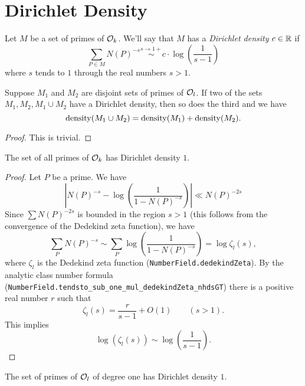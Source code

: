 \section{Dirichlet Density}

\begin{definition} \label{def:Dirichlet density}
	Let $M$ be a set of primes of ${\mathcal O}_k$.
	We'll say that $M$ has a \emph{Dirichlet density} $c \in {\mathbb R}$ if
	\[
		\sum_{P \in M} N(P)^{-s} \stackrel{s \to 1+}\sim c  \cdot \log\left(\frac{1}{s-1}\right)
	\]
	where $s$ tends to $1$ through the real numbers $s>1$.
\end{definition}


\begin{lemma}
	Suppose $M_1$ and $M_2$ are disjoint sets of primes of ${\mathcal O}_l$.
	If two of the sets $M_1, M_2, M_1 \cup M_2$ have a Dirichlet density, then so does the third
	and we have
	\[
		\mathrm{density}(M_1 \cup M_2) = \mathrm{density}(M_1) + \mathrm{density}(M_2).
	\]
\end{lemma}

\begin{proof}
	This is trivial.
\end{proof}

\begin{lemma} \label{lem:Dirichlet density top}
	The set of all primes of ${\mathcal O}_k$ has Dirichlet density $1$.
\end{lemma}

\begin{proof}
	Let $P$ be a prime. We have
	\[
		\left|N(P)^{-s} - \log\left( \frac{1}{1-N(P)^{-s}}\right)\right| \ll N(P)^{-2s}
	\]
	Since $\sum N(P)^{-2s}$ is bounded in the region $s > 1$ (this follows from the convergence of the
	Dedekind zeta function), we have
	\[
		\sum_P N(P)^{-s}
		\sim
		\sum_P \log\left( \frac{1}{1-N(P)^{-s}} \right)
		=
		\log \zeta_l(s),
	\]
	where $\zeta_l$ is the Dedekind zeta function (\texttt{NumberField.dedekindZeta}).
	By the analytic class number formula (\verb!NumberField.tendsto_sub_one_mul_dedekindZeta_nhdsGT!)
	there is a positive real number $r$ such that
	\[
		\zeta_l(s) = \frac{r}{s-1} + O(1) \qquad (s > 1).
	\]
	This implies
	\[
		\log(\zeta_l(s)) \sim \log\left( \frac{1}{s-1}\right).
	\]
\end{proof}



\begin{lemma} \label{lem:Dirichlet density degree one}
	The set of primes of ${\mathcal O}_l$ of degree one has Dirichlet density $1$.
\end{lemma}

